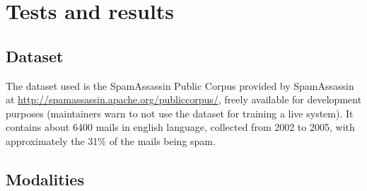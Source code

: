 \section{Tests and results}
\subsection{Dataset}
The dataset used is the SpamAssassin Public Corpus provided by SpamAssassin at \url{http://spamassassin.apache.org/publiccorpus/}, freely available for development purposes (maintainers warn to not use the dataset for training a live system). It contains about 6400 mails in english language, collected from 2002 to 2005, with approximately the 31\% of the mails being spam.

\subsection{Modalities}

